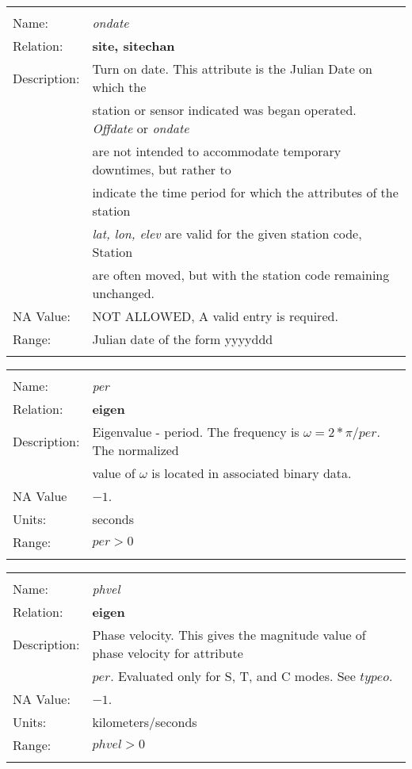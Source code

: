 \begin{tabular*}{6.5 in}{ll} \hline
\\
Name: & {\it ondate} \\
Relation: & {\bf site, sitechan} \\
Description: & Turn on date. This attribute is the Julian Date on which the \\
& station or sensor indicated was began operated. {\it Offdate} or {\it ondate} \\
& are not intended to accommodate temporary downtimes, but rather to \\
& indicate the time period for which the attributes of the station \\
& {\it lat, lon, elev} are valid for the given station code, Station \\
& are often moved, but  with the station code remaining unchanged. \\
NA Value: & NOT ALLOWED, A valid entry is required. \\
Range: & Julian date of the form yyyyddd \\
&\\
\end{tabular*}
\begin{tabular*}{6.5 in}{ll} \hline
\\
Name: & {\it per} \\
Relation: & {\bf eigen} \\
Description: & Eigenvalue - period. The frequency is $\omega=2*\pi/per$. The normalized \\
& value of $\omega$ is located in associated binary data.\\
NA Value & $-1$. \\
Units: & seconds \\
Range: & $per > 0$ \\
&\\
\end{tabular*}
\begin{tabular*}{6.5 in}{ll} \hline
\\
Name: & {\it phvel} \\
Relation: & {\bf eigen} \\
Description: & Phase velocity. This gives the magnitude value of phase velocity for attribute \\
& $per$. Evaluated only for S, T, and C modes. See $typeo$. \\
NA Value: & $-1$. \\
Units: & kilometers/seconds \\
Range: & $phvel > 0$ \\
&\\
\end{tabular*}
